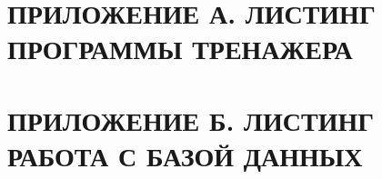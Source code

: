 
\section*{ПРИЛОЖЕНИЕ А. ЛИСТИНГ ПРОГРАММЫ ТРЕНАЖЕРА }
\label{adx:main} 

\renewcommand*{\thelstlisting}{\arabic{lstlisting}}







\newpage
\section*{ПРИЛОЖЕНИЕ Б. ЛИСТИНГ РАБОТА С БАЗОЙ ДАННЫХ}
\label{adx:db}



